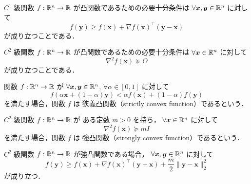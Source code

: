 \begin{theorem}
    $C^1$ 級関数 $f : \mathbb{R}^n \to \mathbb{R}$ が凸関数であるための必要十分条件は
    $\forall \bm{x}, \bm{y} \in \mathbb{R}^n$ に対して
    \begin{equation}
        f(\bm{y}) \ge f(\bm{x}) + \nabla f(\bm{x})^\top (\bm{y} - \bm{x})
    \end{equation}
    が成り立つことである．
\end{theorem}

\begin{theorem}
    $C^2$ 級関数 $f : \mathbb{R}^n \to \mathbb{R}$ が凸関数であるための必要十分条件は
    $\forall \bm{x} \in \mathbb{R}^n$ に対して
    \begin{equation}
        \nabla^2 f(\bm{x}) \succeq O
    \end{equation}
    が成り立つことである．
\end{theorem}

\begin{definition}
    関数 $f : \mathbb{R}^n \to \mathbb{R}$ が
    $\forall \bm{x}, \bm{y} \in \mathbb{R}^n$, $\forall \alpha \in [0, 1]$ に対して
    \begin{equation}
        f\left(\alpha \bm{x} + (1-\alpha) \bm{y}\right)
        < \alpha f(\bm{x}) + (1-\alpha) f(\bm{y})
    \end{equation}
    を満たす場合，関数 $f$ は
     狭義凸関数（strictly convex function）であるという．
\end{definition}

\begin{definition}
    $C^2$ 級関数 $f : \mathbb{R}^n \to \mathbb{R}$ が
    ある定数 $m > 0$ を持ち，
    $\forall \bm{x} \in \mathbb{R}^n$ に対して
    \begin{equation}
        \nabla^2 f(\bm{x}) \succeq m I
    \end{equation}
    を満たす場合，関数 $f$ は
     強凸関数（strongly convex function）であるという．
\end{definition}

\begin{theorem}
    $C^2$ 級関数 $f : \mathbb{R}^n \to \mathbb{R}$ が強凸関数である場合，
    $\forall \bm{x}, \bm{y} \in \mathbb{R}^n$ に対して
    \begin{equation}
        f(\bm{y}) \ge f(\bm{x}) + \nabla f(\bm{x})^\top (\bm{y} - \bm{x})
        + \frac{m}{2} \| \bm{y} - \bm{x} \|_2^2
    \end{equation}
    が成り立つ．
\end{theorem}

